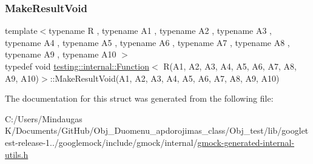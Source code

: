 \mbox{\label{structtesting_1_1internal_1_1_function_3_01_r_07_a1_00_01_a2_00_01_a3_00_01_a4_00_01_a5_00_01_a6f6ff91550f0557b7708e490e5002cd35_aa0f1fef89e59875917d08ba584b05186}} 
\subsubsection{\texorpdfstring{MakeResultVoid}{MakeResultVoid}}
{\footnotesize\ttfamily template$<$typename R , typename A1 , typename A2 , typename A3 , typename A4 , typename A5 , typename A6 , typename A7 , typename A8 , typename A9 , typename A10 $>$ \\
typedef void \mbox{\hyperlink{structtesting_1_1internal_1_1_function}{testing\+::internal\+::\+Function}}$<$ R(A1, A2, A3, A4, A5, A6, A7, A8, A9, A10)$>$\+::Make\+Result\+Void(A1, A2, A3, A4, A5, A6, A7, A8, A9, A10)}



The documentation for this struct was generated from the following file\+:\begin{DoxyCompactItemize}
\item 
C\+:/\+Users/\+Mindaugas K/\+Documents/\+Git\+Hub/\+Obj\+\_\+\+Duomenu\+\_\+apdorojimas\+\_\+class/\+Obj\+\_\+test/lib/googletest-\/release-\/1../googlemock/include/gmock/internal/\mbox{\hyperlink{gmock-generated-internal-utils_8h}{gmock-\/generated-\/internal-\/utils.\+h}}\end{DoxyCompactItemize}
